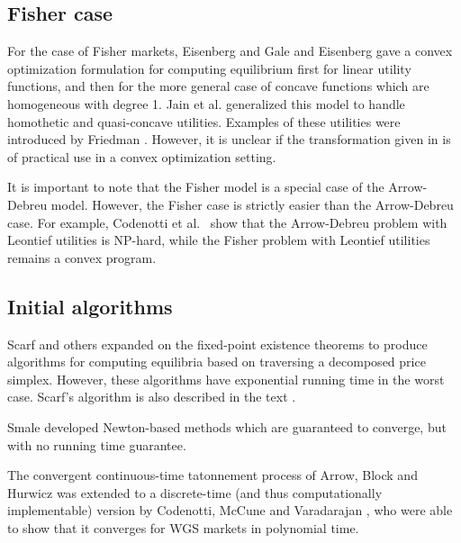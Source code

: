 \documentclass{article}
\begin{document}

\subsection{Fisher case}
For the case of Fisher markets,
Eisenberg and Gale \cite{eisenberg1959consensus, gale1960theory} and
Eisenberg \cite{eisenberg1961aggregation} gave a convex optimization formulation for computing equilibrium first for linear utility functions, and then for the more general case of concave functions which are homogeneous with degree 1.
Jain et al. \cite{jain2005market} generalized this model to handle homothetic and quasi-concave utilities.
Examples of these utilities were introduced by Friedman
\cite{friedman1973concavity}.
However, it is unclear if the transformation given in \cite{jain2005market} is of practical use in a convex optimization setting.

It is important to note that the Fisher model is a special case of the Arrow-Debreu model. However, the Fisher case is strictly easier than the Arrow-Debreu case. For example, Codenotti et al.\ \cite{codenotti2006leontief} show that the Arrow-Debreu problem with Leontief utilities is NP-hard, while the Fisher problem with Leontief utilities remains a convex program.

\subsection{Initial algorithms}

Scarf and others \cite{scarf2008applied,eaves1972homotopies,kuhn1968simplicial}
expanded on the fixed-point existence theorems to produce algorithms for computing equilibria based on traversing a decomposed price simplex. However, these algorithms have exponential running time in the worst case. Scarf's algorithm is also described in the text \cite{shoven1992applying}.

Smale \cite{smale1976convergent, smale1976exchange} developed Newton-based methods which are guaranteed to converge, but with no running time guarantee.

The convergent continuous-time tatonnement process of Arrow, Block and Hurwicz \cite{arrow1959stability} was extended to a discrete-time (and thus computationally implementable) version by Codenotti, McCune and Varadarajan \cite{codenotti2005marketExcess}, who were able to show that it converges for WGS markets in polynomial time.
\end{document}
